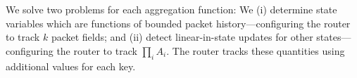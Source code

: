 
We solve two problems for each aggregation function: We (i) determine state
variables which are functions of bounded packet history---configuring the router
to track $k$ packet fields; and (ii) detect linear-in-state updates for other
states---configuring the router to track $\prod_{i} A_i$. The router tracks
these quantities using additional values for each key.





